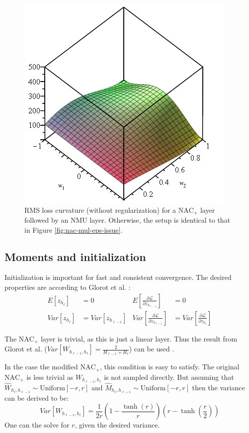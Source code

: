\begin{figure}[H]
\centering
\includegraphics[width=0.4\linewidth]{graphics/nac-mul-nmu.png}
\caption{RMS loss curvature (without regularization) for a $\mathrm{NAC}_{+}$ layer followed by an $\mathrm{NMU}$ layer. Otherwise, the setup is identical to that in Figure \ref{fig:nac-mul-eps-issue}.}
\end{figure}

\subsection{Moments and initialization}

Initialization is important for fast and consistent convergence. The desired properties are according to Glorot et al. \cite{glorot-initialization}:
\begin{equation}
\begin{aligned}
E[z_{h_\ell}] &= 0 & E\left[\frac{\partial \mathcal{L}}{\partial z_{h_{\ell-1}}}\right] &= 0 \\
Var[z_{h_\ell}] &= Var\left[z_{h_{\ell-1}}\right] &
Var\left[\frac{\partial \mathcal{L}}{\partial z_{h_{\ell-1}}}\right] &= Var\left[\frac{\partial \mathcal{L}}{\partial z_{h_{\ell}}}\right]
\end{aligned}
\end{equation}

The $\mathrm{NAC}_{+}$ layer is trivial, as this is just a linear layer. Thus the result from Glorot et al. ($Var[W_{h_{\ell-1},h_{\ell}}] = \frac{2}{H_{\ell-1} + H_{\ell}}$) can be used \cite{glorot-initialization}.

In the case the modified $\mathrm{NAC}_{+}$, this condition is easy to satisfy. The original $\mathrm{NAC}_{+}$ is less trivial as $W_{h_{\ell-1},h_{\ell}}$ is not sampled directly. But assuming that $\hat{W}_{h_\ell, h_{\ell-1}} \sim \mathrm{Uniform}[-r, r]$ and $\hat{M}_{h_\ell, h_{\ell-1}} \sim \mathrm{Uniform}[-r, r]$ then the variance can be derived to be:
\begin{equation}
Var[W_{h_{\ell-1},h_{\ell}}] = \frac{1}{2r} \left(1 - \frac{\tanh(r)}{r}\right) \left(r - \tanh\left(\frac{r}{2}\right)\right)
\end{equation}
One can the solve for $r$, given the desired variance. 


